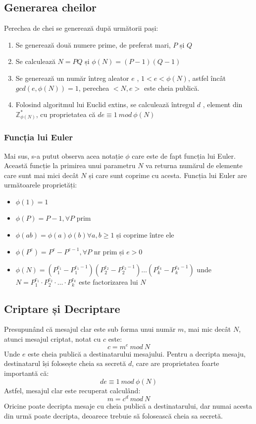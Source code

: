 \documentclass[12pt, oneside]{book}
\begin{document}
\subsection{Generarea cheilor}
Perechea de chei se generează după următorii pași:
\begin{enumerate}
\item Se generează două numere prime, de preferat mari, $P$ și $Q$
\item Se calculează $N=PQ$ și $\phi(N)=(P-1)(Q-1)$
\item Se generează un număr întreg aleator $e$ , $1<e<\phi(N)$, astfel încât $gcd(e,\phi(N))=1$, perechea $<N,e>$ este cheia publică.
\item Folosind algoritmul lui Euclid extins, se calculează întregul $d$ , element din $\mathbb{Z}_{\phi(N)}^{*}$, cu proprietatea că $de \equiv 1 \ mod \ \phi(N)$
\end{enumerate}
\subsubsection{Funcția lui Euler}
Mai sus, s-a putut observa acea notație $\phi$ care este de fapt funcția lui Euler. Această funcție la primirea unui parametru $N$ va returna numărul de elemente care sunt mai mici decât $N$ și care sunt coprime cu acesta. Funcția lui Euler are următoarele proprietăți:
\begin{itemize}
\item $\phi(1)=1$
\item $\phi(P)=P-1, \forall P$ prim
\item $\phi(ab)=\phi(a)\phi(b) \forall a,b \geq 1$ și coprime între ele
\item $\phi(P^e)=P^e - P^{e-1}, \forall P$ nr prim și $e > 0$
\item $\phi(N) = (P^{e_1}_{1} - P^{e_1-1}_1)(P^{e_2}_{2} - P^{e_2-1}_2) \dots (P^{e_k}_{k} - P^{e_k-1}_k)$ unde $N= P^{e_1}_{1} \cdot P^{e_2}_{2} \cdot \dots \cdot P^{e_k}_{k}$ este factorizarea lui $N$
\end{itemize}
\subsection{Criptare și Decriptare}
Presupunând că mesajul clar este sub forma unui număr $m$, mai mic decât $N$, atunci mesajul criptat, notat cu $c$ este:
$$c = m^e \ mod \ N$$
Unde $e$ este cheia publică a destinatarului mesajului. Pentru a decripta mesaju, destinatarul își folosește cheia sa secretă $d$, care are proprietatea foarte importantă că:
$$de \equiv 1 \ mod \ \phi(N)$$
Astfel, mesajul clar este recuperat calculând:
$$m = c^d \ mod \ N$$
Oricine poate decripta mesaje cu cheia publică a destinatarului, dar numai acesta din urmă poate decripta, deoarece trebuie să folosească cheia sa secretă.
\end{document}
